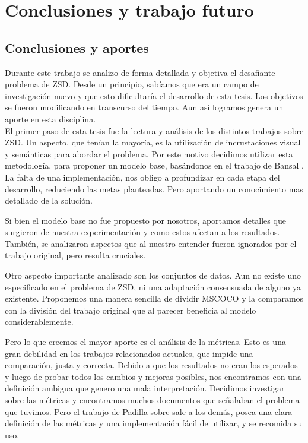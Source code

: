 \chapter{Conclusiones y trabajo futuro} \label{cap:conclusiones}

\section{Conclusiones y aportes} \label{sec:conclusionesyaportes}
Durante este trabajo se analizo de forma detallada y objetiva el desafiante problema de ZSD. Desde un principio, sabíamos que era un campo de investigación nuevo y que esto dificultaría el desarrollo de esta tesis. Los objetivos se fueron modificando en transcurso del tiempo. Aun así logramos genera un aporte en esta disciplina.\\

El primer paso de esta tesis fue la lectura y análisis de los distintos trabajos sobre ZSD. Un aspecto, que tenían la mayoría, es la utilización de incrustaciones visual y semánticas para abordar el problema. Por este motivo decidimos utilizar esta metodología, para proponer un modelo base, basándonos en el trabajo de Bansal \cite{bansal2018zero}. La falta de una implementación, nos obligo a profundizar en cada etapa del desarrollo, reduciendo las metas planteadas. Pero aportando un conocimiento mas detallado de la solución. 

Si bien el modelo base no fue propuesto por nosotros, aportamos detalles que surgieron de nuestra experimentación y como estos afectan a los resultados. También, se analizaron aspectos que al nuestro entender fueron ignorados por el trabajo original, pero resulta cruciales.

Otro aspecto importante analizado son los conjuntos de datos. Aun no existe uno especificado en el problema de ZSD, ni una adaptación consensuada de alguno ya existente. Proponemos una manera sencilla de dividir MSCOCO y la comparamos con la división del trabajo original que al parecer beneficia al modelo considerablemente.

Pero lo que creemos el mayor aporte es el análisis de la métricas. Esto es una gran debilidad en los trabajos relacionados actuales, que impide una comparación, justa y correcta. Debido a que los resultados no eran los esperados y luego de probar todos los cambios y mejoras posibles, nos encontramos con una definición ambigua que genero una mala interpretación. Decidimos investigar sobre las métricas y encontramos muchos documentos que señalaban el problema que tuvimos. Pero el trabajo de Padilla \cite{padilla2020survey} sobre sale a los demás, posea una clara definición de las métricas y una implementación fácil de utilizar, y se recomida su uso.

